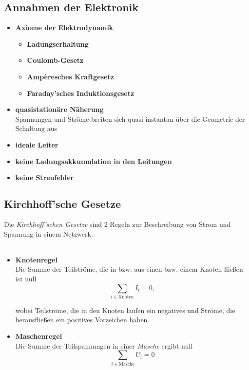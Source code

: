 \documentclass{article}
\begin{document}
\subsection{Annahmen der Elektronik}
	\begin{itemize}
		\item \textbf{Axiome der Elektrodynamik}
			\begin{itemize}
				\item \textbf{Ladungserhaltung}
				\item \textbf{Coulomb-Gesetz}
				\item \textbf{Ampèresches Kraftgesetz}
				\item \textbf{Faraday'sches Induktionsgesetz}
			\end{itemize}

		
		\item \textbf{quasistationäre Näherung}\\
		Spannungen und Ströme breiten sich quasi instantan über die Geometrie der Schaltung aus 		
		
		
		\item \textbf{ideale Leiter}
		
		
		\item \textbf{keine Ladungsakkumulation in den Leitungen}
		
		
		\item \textbf{keine Streufelder}		
	\end{itemize}


\newpage


\subsection{Kirchhoff'sche Gesetze}
Die \textit{Kirchhoff'schen Gesetze} sind 2 Regeln zur Beschreibung von Strom und Spannung in einem Netzwerk.\\
\\
	\begin{itemize}
		\item \textbf{Knotenregel}\\
		Die Summe der Teilströme, die in bzw. aus einen bzw. einem Knoten fließen ist null
			\begin{equation}
				\sum_{i \in \text{Knoten}} I_i = 0,
			\end{equation}
		
		wobei Teilströme, die in den Knoten laufen ein negatives und Ströme, die herausfließen ein positives Vorzeichen haben.


		\item \textbf{Maschenregel}\\
		Die Summe der Teilspannungen in einer \textit{Masche} ergibt null
			\begin{equation}
				\sum_{i \in \text{Masche}} U_i = 0
			\end{equation}
	\end{itemize}
\end{document}
